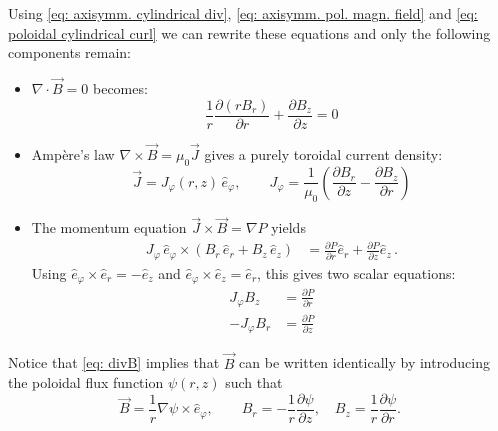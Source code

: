 Using \eqref{eq: axisymm. cylindrical div}, \eqref{eq: axisymm. pol. magn. field} and \eqref{eq: poloidal cylindrical curl} 
we can rewrite these equations and only the following components remain:

\begin{itemize}
    \item $\nabla \cdot \vec{B} = 0$ becomes:
        \begin{equation}
            \frac{1}{r}\frac{\partial (r B_r)}{\partial r} + \frac{\partial B_z}{\partial z} = 0
            \label{eq: divB}
        \end{equation}

    \item Ampère's law $\nabla \times \vec{B} = \mu_0 \vec{J}$ gives a purely toroidal current density:
        \begin{equation}
            \vec{J} = J_\varphi(r,z)\,\hat{e}_\varphi, \qquad 
            J_\varphi = \frac{1}{\mu_0}\left(\frac{\partial B_r}{\partial z} - \frac{\partial B_z}{\partial r}\right)
            \label{eq: J_phi}
        \end{equation}

    \item The momentum equation $\vec{J} \times \vec{B} = \nabla P$ yields
        \begin{align}
            J_\varphi\,\hat{e}_\varphi \times \left(B_r\,\hat{e}_r + B_z\,\hat{e}_z\right) 
            &= \frac{\partial P}{\partial r}\hat{e}_r + \frac{\partial P}{\partial z}\hat{e}_z  \, .
            \label{eq: mom eq}
        \end{align}
        Using $\hat{e}_\varphi \times \hat{e}_r = -\hat{e}_z$ and $\hat{e}_\varphi \times \hat{e}_z = \hat{e}_r$, 
        this gives two scalar equations:
        \begin{align}
            J_\varphi B_z &= \frac{\partial P}{\partial r} \label{eq: momentum_r}\\
            -J_\varphi B_r &= \frac{\partial P}{\partial z} \label{eq: momentum_z}
        \end{align}
\end{itemize}

Notice that \eqref{eq: divB} implies that $\vec{B}$ can be written identically
by introducing the poloidal flux function $\psi(r,z)$ such that
\begin{equation}
    \vec{B} = \frac{1}{r} \nabla\psi \times \hat{e}_\varphi,
    \qquad
    B_r = -\frac{1}{r}\frac{\partial \psi}{\partial z}, \quad
    B_z = \frac{1}{r}\frac{\partial \psi}{\partial r}.
    \label{eq: B as fct of psi}
\end{equation}


